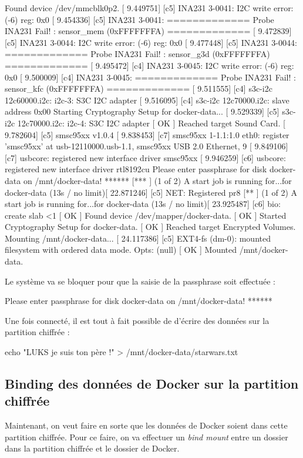 \documentclass[11pt,a4paper,oneside]{report}
\begin{document}
\begin{bashcode}
[  OK  ] Found device /dev/mmcblk0p2.
[    9.449751] [c5] INA231 3-0041: I2C write error: (-6) reg: 0x0
[    9.454336] [c5] INA231 3-0041: ============= Probe INA231 Fail! : sensor_mem (0xFFFFFFFA) =============
[    9.472839] [c5] INA231 3-0044: I2C write error: (-6) reg: 0x0
[    9.477448] [c5] INA231 3-0044: ============= Probe INA231 Fail! : sensor_g3d (0xFFFFFFFA) =============
[    9.495472] [c4] INA231 3-0045: I2C write error: (-6) reg: 0x0
[    9.500009] [c4] INA231 3-0045: ============= Probe INA231 Fail! : sensor_kfc (0xFFFFFFFA) =============
[    9.511555] [c4] s3c-i2c 12c60000.i2c: i2c-3: S3C I2C adapter
[    9.516095] [c4] s3c-i2c 12c70000.i2c: slave address 0x00
         Starting Cryptography Setup for docker-data...
[    9.529339] [c5] s3c-i2c 12c70000.i2c: i2c-4: S3C I2C adapter
[  OK  ] Reached target Sound Card.
[    9.782604] [c5] smsc95xx v1.0.4
[    9.838453] [c7] smsc95xx 1-1.1:1.0 eth0: register 'smsc95xx' at usb-12110000.usb-1.1, smsc95xx USB 2.0 Ethernet, 9
[    9.849106] [c7] usbcore: registered new interface driver smsc95xx
[    9.946259] [c6] usbcore: registered new interface driver rtl8192cu
Please enter passphrase for disk docker-data on /mnt/docker-data! ******
[***   ] (1 of 2) A start job is running for...for docker-data (13s / no limit)[   22.871246] [c5] NET: Registered pr8
[**    ] (1 of 2) A start job is running for...for docker-data (13s / no limit)[   23.925487] [c6] bio: create slab <1
[  OK  ] Found device /dev/mapper/docker-data.
[  OK  ] Started Cryptography Setup for docker-data.
[  OK  ] Reached target Encrypted Volumes.
         Mounting /mnt/docker-data...
[   24.117386] [c5] EXT4-fs (dm-0): mounted filesystem with ordered data mode. Opts: (null)
[  OK  ] Mounted /mnt/docker-data.
\end{bashcode}

Le système va se bloquer pour que la saisie de la passphrase soit effectuée :
\begin{bashcode}
Please enter passphrase for disk docker-data on /mnt/docker-data! ******
\end{bashcode}

Une fois connecté, il est tout à fait possible de d'écrire des données sur la partition chiffrée :
\begin{bashcode}
echo "LUKS je suis ton père !" > /mnt/docker-data/starwars.txt
\end{bashcode}


\subsection{Binding des données de Docker sur la partition chiffrée}
Maintenant, on veut faire en sorte que les données de Docker soient dans cette partition chiffrée. Pour ce faire, on va effectuer un \textit{bind mount} entre un dossier dans la partition chiffrée et le dossier de Docker.
\end{document}
